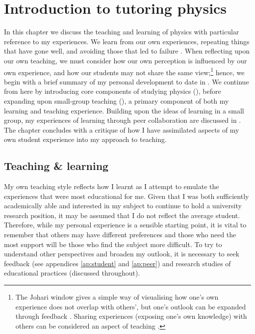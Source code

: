 \chapter{Introduction to tutoring physics}\label{ch:intro}

In this chapter we discuss the teaching and learning of physics with particular reference to my experiences. We learn from our own experiences, repeating things that have gone well, and avoiding those that led to failure \citep[chapter 2]{Skinner1954,Kolb1984}. When reflecting upon our own teaching, we must consider how our own perception is influenced by our own experience, and how our students may not share the same view;\footnote{The Johari window gives a simple way of visualising how one's own experience does not overlap with others', but one's outlook can be expanded through feedback \citep{Luft1961}. Sharing experiences (exposing one's own knowledge) with others can be considered an aspect of teaching \citep[cf.][chapter 7]{Ramsden1992}.} hence, we begin with a brief summary of my personal development to date in . We continue from here by introducing core components of studying physics (), before expanding upon small-group teaching (), a primary component of both my learning and teaching experience. Building upon the ideas of learning in a small group, my experiences of learning through peer collaboration are discussed in . The chapter concludes with a critique of how I have assimilated aspects of my own student experience into my approach to teaching.

\section{Teaching \& learning}\label{sec:teach-n-learn}

My own teaching style reflects how I learnt as I attempt to emulate the experiences that were most educational for me. Given that I was both sufficiently academically able and interested in my subject to continue to hold a university research position, it may be assumed that I do not reflect the average student. Therefore, while my personal experience is a sensible starting point, it is vital to remember that others may have different preferences \citep[chapter 5]{Ramsden1992} and those who need the most support will be those who find the subject more difficult. To try to understand other perspectives and broaden my outlook, it is necessary to seek feedback (see appendices \ref{ap:student} and \ref{ap:peer}) and research studies of educational practices (discussed throughout).

